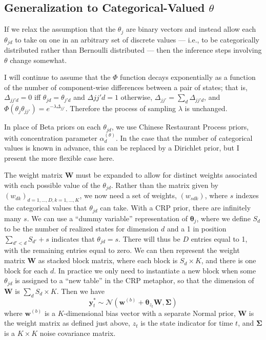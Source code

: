 \documentclass[12pt,letterpaper]{report}
\newcommand{\Norm}[2]{\mathcal{N}(#1,#2)}
\newcommand{\by}{\mathbf{y}}
\newcommand{\bw}{\mathbf{w}}
\newcommand{\bW}{\mathbf{W}}
\newcommand{\btheta}{\boldsymbol{\theta}}
\newcommand{\bSigma}{\boldsymbol{\Sigma}}
\begin{document}
\subsection{Generalization to Categorical-Valued $\theta$}
If we relax the assumption that the $\theta_j$ are binary vectors and
instead allow each $\theta_{jd}$ to take on one in an arbitrary set of
discrete values --- i.e., to be categorically distributed rather than
Bernoulli distributed --- then the inference steps involving $\theta$
change somewhat.  

I will continue to assume that the $\Phi$ function
decays exponentially as a function of the number of component-wise
differences between a pair of states; that is, $\Delta_{jj'd} = 0$ iff
$\theta_{jd} = \theta_{j'd}$ and $\Delta{jj'd} = 1$ otherwise,
$\Delta_{jj'} = \sum_{d} \Delta_{jj'd}$, and
$\Phi(\theta_{j}\theta_{jj'}) = e^{-\lambda\Delta_{jj'}}$.  Therefore
the process of sampling $\lambda$ is unchanged.

In place of Beta priors on each $\theta_{jd}$, we use Chinese
Restaurant Process priors, with concentration parameter
$\alpha_{d}^{(\theta)}$.  In the case that the number of categorical 
values is known in advance, this can be replaced by a Dirichlet 
prior, but I present the more flexible case here.

The weight matrix $\bW$ must be expanded to allow for distinct weights
associated with each possible value of the $\theta_{jd}$.  Rather than
the matrix given by $(w_{dk})_{d=1,\dots,D,k=1,\dots,K}$, we now need
a set of weights, $(w_{sdk})$, where $s$ indexes the categorical
values that $\theta_{jd}$ can take.  With a CRP prior, there are
infinitely many $s$.  We can use a ``dummy variable'' representation
of $\btheta_j$, where we define $S_d$ to be the number of realized
states for dimension $d$ and a 1 in position $\sum_{d' < d} S_{d'} + s$ indicates that
$\theta_{jd} = s$.  There will thus be $D$ entries equal to 1, with
the remaining entries equal to zero.  We can then represent the weight
matrix $\bW$ as stacked block matrix, where each block is $S_d
\times K$, and there is one block for each $d$.  In practice we only
need to instantiate a new block when some $\theta_{jd}$ is assigned to
a ``new table'' in the CRP metaphor, so that the dimension of $\bW$ is
$\sum_d S_d \times K$.  Then we have
\begin{equation}
  \by^*_{t} \sim \Norm{\bw^{(b)} + \btheta_{z_t}\bW }{\bSigma}
\end{equation}
where $\bw^{(b)}$ is a $K$-dimensional bias vector with a separate Normal
prior, $\bW$ is the weight matrix as defined just above, $z_t$ is the
state indicator for time $t$, and $\bSigma$ is a $K \times K$ noise covariance matrix.
\end{document}
